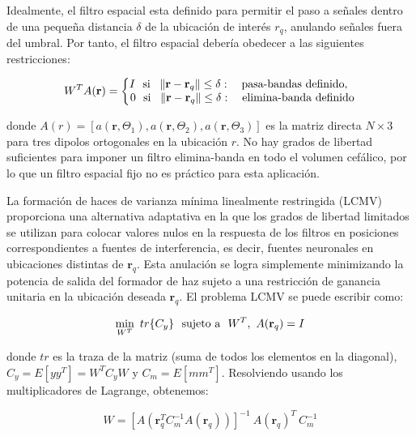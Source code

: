 \documentclass[11pt,letterpaper]{article}
\numberwithin{equation}{subsection}
\numberwithin{table}{subsection}
\begin{document}
\bigskip
\noindent Idealmente, el filtro espacial esta definido para permitir el paso a señales dentro de una pequeña distancia $\delta$ de la ubicación de interés $r_q$, anulando señales fuera del umbral. Por tanto, el filtro espacial debería obedecer a las siguientes restricciones:

\begin{equation}
W^T A(\textbf{r}) = \left\{\begin{matrix}
I \ \ \textup{si} \ \ \left \| \mathbf{r} - \mathbf{r}_q \right \| \leq \delta: \ \ \  \textup{pasa-bandas definido}, \ \  \\ 
0 \ \ \textup{si} \ \ \left \| \mathbf{r} - \mathbf{r}_q \right \| \leq \delta: \ \ \ \textup{elimina-banda definido}
\end{matrix}\right.
\end{equation}

\smallskip
\noindent donde $A(r) = [a(\mathbf{r},\Theta_1), a(\mathbf{r},\Theta_2), a(\mathbf{r},\Theta_3) ]$ es la matriz directa $N \times 3$ para tres dipolos ortogonales en la ubicación $r$. No hay grados de libertad suficientes para imponer un filtro elimina-banda en todo el volumen cefálico, por lo que un filtro espacial fijo no es práctico para esta aplicación.

\bigskip
\noindent La formación de haces de varianza mínima linealmente restringida (LCMV) proporciona una alternativa adaptativa en la que los grados de libertad limitados se utilizan para colocar valores nulos en la respuesta de los filtros en posiciones correspondientes a fuentes de interferencia, es decir, fuentes neuronales en ubicaciones distintas de $\mathbf{r}_q$. Esta anulación se logra simplemente minimizando la potencia de salida del formador de haz sujeto a una restricción de ganancia unitaria en la ubicación deseada $\mathbf{r}_q$. El problema LCMV se puede escribir como:

\begin{equation}
\min_{W^T} \ tr\{ C_y\} \ \ \textup{sujeto a} \ \ W^T, \ A(\mathbf{r}_q) = I
\end{equation}

\smallskip
\noindent donde $tr$ es la traza de la matriz (suma de todos los elementos en la diagonal), $C_y=E[yy^T]=W^TC_yW$ y $C_m = E[mm^T]$. Resolviendo usando los multiplicadores de Lagrange, obtenemos: 

\begin{equation}
W = [A(\mathbf{r}_q^T C_m^{-1}A(\mathbf{r}_q))]^{-1} \ A(\mathbf{r}_q)^T \ C_m^{-1}
\end{equation}
\end{document}
